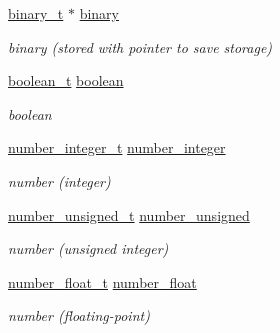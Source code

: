 \begin{DoxyCompactItemize}
\hyperlink{classnlohmann_1_1basic__json_ad6c955145bebde84d93991ffed7cd389}{binary\+\_\+t} $\ast$ \hyperlink{classnlohmann_1_1basic__json_a9a4a1bb634091c7ebd66c4e989ed469d}{binary}
\begin{DoxyCompactList}\small\item\em binary (stored with pointer to save storage) \end{DoxyCompactList}\item 
\hyperlink{classnlohmann_1_1basic__json_a44fd1a12c9c54623c942b430e7a72937}{boolean\+\_\+t} \hyperlink{classnlohmann_1_1basic__json_a7386443608348fa4b451f033a1439074}{boolean}
\begin{DoxyCompactList}\small\item\em boolean \end{DoxyCompactList}\item 
\hyperlink{classnlohmann_1_1basic__json_a11e390944da90db83089eb2426a749d3}{number\+\_\+integer\+\_\+t} \hyperlink{classnlohmann_1_1basic__json_ad88685d4cc24d7e86ddc5b0edb64192a}{number\+\_\+integer}
\begin{DoxyCompactList}\small\item\em number (integer) \end{DoxyCompactList}\item 
\hyperlink{classnlohmann_1_1basic__json_ae09af9c23351b7245d9be4d1b2035fef}{number\+\_\+unsigned\+\_\+t} \hyperlink{classnlohmann_1_1basic__json_a077b1e7977afafb97a6a38a3a617ba66}{number\+\_\+unsigned}
\begin{DoxyCompactList}\small\item\em number (unsigned integer) \end{DoxyCompactList}\item 
\hyperlink{classnlohmann_1_1basic__json_a5b8abaebd922d82d69756327c0c347e6}{number\+\_\+float\+\_\+t} \hyperlink{classnlohmann_1_1basic__json_abe229fa4c3b1f3536c7a85ab9cbff2e7}{number\+\_\+float}
\begin{DoxyCompactList}\small\item\em number (floating-\/point) \end{DoxyCompactList}\end{DoxyCompactItemize}
